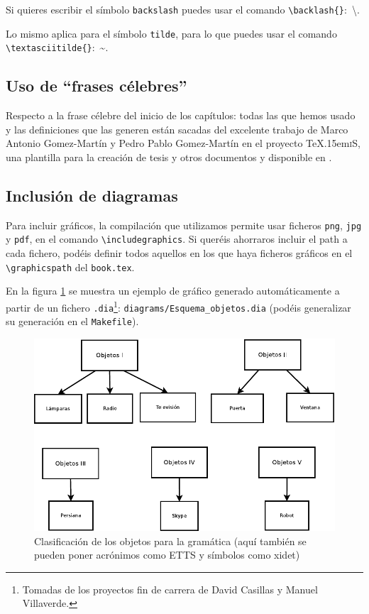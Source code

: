 \documentclass[spanish,openright]{book}
\def\texis{\TeX \raise.15em\hbox{\textsc{i}}S}
\begin{document}
Si quieres escribir el símbolo \texttt{backslash} puedes usar el comando
\texttt{\textbackslash{}backlash\{\}}:~\textbackslash{}.

Lo mismo aplica para el símbolo \texttt{tilde}, para lo que puedes usar
el comando \texttt{\textbackslash{}textasciitilde\{\}}:~\textasciitilde{}.


\subsection{Uso de ``frases célebres''}
\label{sec:uso-de-frases}

Respecto a la frase célebre del inicio de los capítulos: todas las que
hemos usado y las definiciones que las generen están sacadas del
excelente trabajo de Marco Antonio Gomez-Martín y Pedro Pablo
Gomez-Martín en el proyecto \texis, una plantilla para la creación de
tesis y otros documentos y disponible en \cite{texis}.


\subsection{Inclusión de diagramas}
\label{sec:diagrama}

Para incluir gráficos, la compilación que utilizamos permite usar
ficheros \texttt{png}, \texttt{jpg} y \texttt{pdf}, en el comando
\texttt{\textbackslash{}includegraphics}. Si queréis ahorraros incluir
el path a cada fichero, podéis definir todos aquellos en los que haya
ficheros gráficos en el \texttt{\textbackslash{}graphicspath} del
\texttt{book.tex}.

En la figura \ref{fig:fig_clobj} se muestra un ejemplo de gráfico
generado automáticamente a partir de un fichero
\texttt{.dia}\footnote{Tomadas de los proyectos fin de carrera de David
  Casillas y Manuel Villaverde.}: \texttt{diagrams/Esquema\_objetos.dia}
(podéis generalizar su generación en el \texttt{Makefile}).

\begin{figure}[tphb]
  \centering
  \includegraphics{Esquema_objetos}
  \caption{Clasificación de los objetos para la gramática (aquí también
    se pueden poner acrónimos como \acs{ETTS} y símbolos como \ac{xidet})}
  \label{fig:fig_clobj}
\end{figure}
\end{document}
